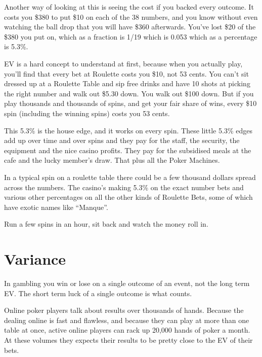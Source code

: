 Another way of looking at this is seeing the cost if you backed every
outcome. It costs you \$380 to put \$10 on each of the 38 numbers, and
you know without even watching the ball drop that you will have \$360
afterwards. You've lost \$20 of the \$380 you put on, which as a
fraction is 1/19 which is 0.053 which as a percentage is 5.3\%.


EV is a hard concept to understand at first, because when you actually
play, you'll find that every bet at Roulette costs you \$10, not
53 cents. You can't sit dressed up at a Roulette Table and sip free
drinks and have 10 shots at picking the right number and walk out \$5.30
down. You walk out \$100 down. But if you play thousands and thousands
of spins, and get your fair share of wins, every \$10 spin (including
the winning spins) costs you 53 cents.

This 5.3\% is the house edge, and it works on every spin. These little 5.3\%
edges add up over time and over spins and they pay for the staff, the
security, the equipment and the nice casino profits. They pay for the
subsidised meals at the cafe and the lucky member's draw. That plus
all the Poker Machines.

In a typical spin on a roulette table there could be a few thousand dollars
spread across the numbers. The casino's making 5.3\% on the exact number
bets and various other percentages on all the other kinds of Roulette Bets,
some of which have exotic names like ``Manque''.

Run a few spins in an hour, sit back and watch the money roll in.

\section{Variance}

In gambling you win or lose on a single outcome of an event,
not the long term EV. The short term luck of a single outcome
is what counts.

Online poker players talk about results over thousands of hands. Because the
dealing online is fast and flawless, and because they can play at
more than one table at once, active online players can rack up
20,000 hands of poker a month. At these volumes they expects their
results to be pretty close to the EV of their bets.

